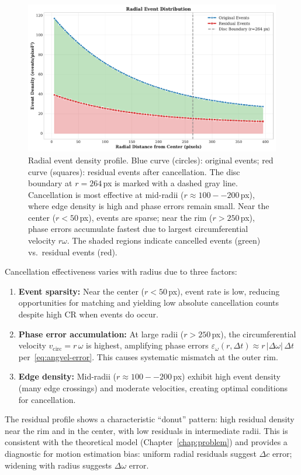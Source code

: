 \begin{figure}[t]
  \centering
  \includegraphics[width=0.75\linewidth]{../code/thesis_figures/figure_radial_profile.pdf}
  \caption{Radial event density profile. Blue curve (circles): original events; red curve (squares): residual events after cancellation. The disc boundary at $r=264$\,px is marked with a dashed gray line. Cancellation is most effective at mid-radii ($r \approx 100--200$\,px), where edge density is high and phase errors remain small. Near the center ($r < 50$\,px), events are sparse; near the rim ($r > 250$\,px), phase errors accumulate fastest due to largest circumferential velocity $r\omega$. The shaded regions indicate cancelled events (green) vs.\ residual events (red).}
  \label{fig:radial_profile}
\end{figure}

Cancellation effectiveness varies with radius due to three factors:
\begin{enumerate}
\item \textbf{Event sparsity:} Near the center ($r < 50$\,px), event rate is low, reducing opportunities for matching and yielding low absolute cancellation counts despite high CR when events do occur.
\item \textbf{Phase error accumulation:} At large radii ($r > 250$\,px), the circumferential velocity $v_{\text{circ}} = r\,\omega$ is highest, amplifying phase errors $\varepsilon_{\omega}(r,\Delta t) \approx r\,|\Delta\omega|\,\Delta t$ per~\eqref{eq:angvel-error}. This causes systematic mismatch at the outer rim.
\item \textbf{Edge density:} Mid-radii ($r \approx 100--200$\,px) exhibit high event density (many edge crossings) and moderate velocities, creating optimal conditions for cancellation.
\end{enumerate}

The residual profile shows a characteristic ``donut'' pattern: high residual density near the rim and in the center, with low residuals in intermediate radii. This is consistent with the theoretical model (Chapter~\ref{chap:problem}) and provides a diagnostic for motion estimation bias: uniform radial residuals suggest $\Delta c$ error; widening with radius suggests $\Delta\omega$ error.

